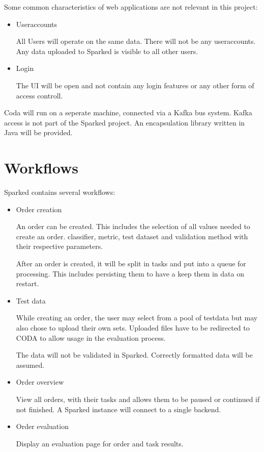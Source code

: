 \documentclass[12pt,a4paper,titlepage,oneside,BCOR1cm]{scrreprt}
\begin{document}
Some common characteristics of web applications are not relevant in this project:
\begin{itemize}
  \item Useraccounts

  All Users will operate on the same data. There will not be any useraccounts. Any data uploaded to Sparked is visible to all other users.
  \item Login

  The UI will be open and not contain any login features or any other form of access controll.
\end{itemize}

Coda will run on a seperate machine, connected via a Kafka bus system. Kafka access is not part of the Sparked project. An encapsulation library written in Java will be provided.

\section{Workflows}

Sparked contains several workflows:
\begin{itemize}
  \item Order creation

  An order can be created. This includes the selection of all values needed to create an order. classifier, metric, test dataset and validation method with their respective parameters.

  After an order is created, it will be split in tasks and put into a queue for processing. This includes persisting them to have a keep them in data on restart.

  \item Test data

  While creating an order, the user may select from a pool of testdata but may also chose to upload their own sets. Uploaded files have to be redirected to CODA to allow usage in the evaluation process.

  The data will not be validated in Sparked. Correctly formatted data will be assumed.

  \item Order overview

  View all orders, with their tasks and allows them to be paused or continued if not finished. A Sparked instance will connect to a single backend. 

  \item Order evaluation
  
  Display an evaluation page for order and task results.
\end{itemize}
\end{document}
